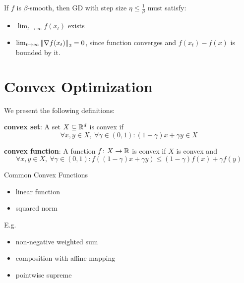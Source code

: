 \begin{corollary}
    If \(f\) is \(\beta\)-smooth, then GD with step size \(\eta \leq \frac{1}{\beta}\) must 
    satisfy: 
    \begin{itemize}
        \item \(\lim_{t \to \infty} f(x_t)\) exists 
        \item \(\lim_{t \to \infty} \norm{\nabla f(x_t)}_2 = 0\), since function converges and 
        \(f(x_t) - f(x)\) is bounded by it. 
    \end{itemize}
\end{corollary}

\section{Convex Optimization}

\begin{definition}[convexity] We present the following definitions: 
    
    \textbf{convex set}: A set \(X \subseteq \mathbb{R}^d\) is convex if 
    \[
        \forall x, y \in X, \ \forall \gamma \in (0,1) \colon (1 - \gamma)x + \gamma y \in X   
    \]

    \textbf{convex function}: A function \(f \colon X \to \mathbb{R}\) is convex if \(X\) is convex 
    and 
    \[
        \forall x, y \in X, \ \forall \gamma \in (0,1) \colon 
        f \left((1 - \gamma)x + \gamma y\right) \leq (1 - \gamma) f(x) + \gamma f(y)
    \]
\end{definition}

\begin{eg} Common Convex Functions 

    \begin{itemize}
        \item linear function 
        \item squared norm
    \end{itemize}
    
\end{eg}

\begin{eg} E.g. 


    \begin{itemize}
        \item non-negative weighted sum 
        \item composition with affine mapping 
        \item pointwise supreme 
    \end{itemize}
\end{eg}


